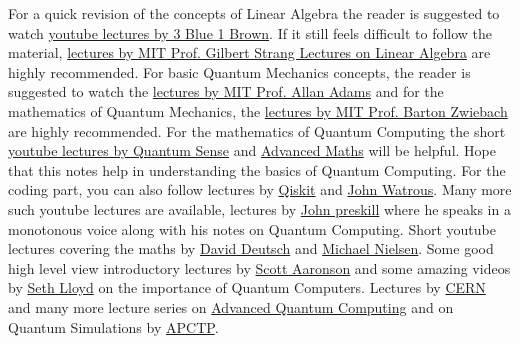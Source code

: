 \documentclass[12pt, oneside]{book}
\theoremstyle{definition}
\theoremstyle{definition}
\theoremstyle{remark}
\begin{document}
For a quick revision of the concepts of Linear Algebra the 
reader is suggested to watch \href{https://www.youtube.com/watch?v=fNk_zzaMoSs&list=PLZHQObOWTQDPD3MizzM2xVFitgF8hE_ab}{youtube lectures by 3 Blue 1 Brown}. If it still feels 
difficult to follow the material, \href{https://www.youtube.com/watch?v=7UJ4CFRGd-U&list=PL221E2BBF13BECF6C}{lectures by MIT Prof. Gilbert
Strang Lectures on Linear Algebra} are highly recommended. For basic Quantum Mechanics
concepts, the reader is suggested to watch the \href{https://www.youtube.com/watch?v=lZ3bPUKo5zc&list=PLUl4u3cNGP61-9PEhRognw5vryrSEVLPr}{lectures by MIT Prof. Allan Adams} and for the mathematics
of Quantum Mechanics, the \href{https://www.youtube.com/watch?v=jANZxzetPaQ&list=PLUl4u3cNGP60cspQn3N9dYRPiyVWDd80G}{lectures by MIT Prof. Barton Zwiebach} are highly recommended. For the 
mathematics of Quantum Computing the short \href{https://www.youtube.com/watch?v=3nvbBEzfmE8&list=PL8ER5-vAoiHAWm1UcZsiauUGPlJChgNXC}{youtube lectures by Quantum Sense} and \href{https://www.youtube.com/watch?v=zm64o27eHYw&list=PLxP0p--aBHmIe--9rczWe4AZmw03e2bz0}{Advanced Maths} will be helpful. Hope that this
notes help in understanding the basics of Quantum Computing. 
For the coding part, you can also follow lectures by \href{https://www.youtube.com/watch?v=Rs2TzarBX5I&list=PLOFEBzvs-VvrXTMy5Y2IqmSaUjfnhvBHR}{Qiskit} and \href{https://www.youtube.com/watch?v=42OiBzfdE2o&list=PLOFEBzvs-VvqKKMXX4vbi4EB1uaErFMSO}{John Watrous}.
Many more such youtube lectures are available, lectures by \href{https://www.youtube.com/watch?v=w08pSFsAZvE&list=PL0ojjrEqIyPy-1RRD8cTD_lF1hflo89Iu}{John preskill} where he speaks in a monotonous voice along with his notes on Quantum Computing.
Short youtube lectures covering the maths by \href{https://www.youtube.com/watch?v=mpkYPEaifUg&list=PLqdVnC7OWuEcfKRZXsrooK_EPzwmWSi-N}{David Deutsch} and \href{https://www.youtube.com/watch?v=X2q1PuI2RFI&list=PL1826E60FD05B44E4}{Michael Nielsen}.
Some good high level view introductory lectures by \href{https://www.youtube.com/watch?v=s1bxNomtaTE}{Scott Aaronson} and some amazing videos by \href{https://www.youtube.com/results?search_query=Quantum+Compting+Seth+lloyd}{Seth Lloyd} on the importance of Quantum Computers.
Lectures by \href{https://www.youtube.com/watch?v=jwHM8AHOtJ0&list=PL_rDPTSJrz8eFc6lb8twvsV39cxSwpJ6r}{CERN} and many more lecture series on \href{https://www.youtube.com/watch?v=vOo1rI_RRJo&list=PLDOlG2kTN3Z4xwQmnjSQomAqr3YDyCreJ}{Advanced Quantum Computing} and on
Quantum Simulations by \href{https://www.youtube.com/watch?v=a2ZxgUc20LE&list=PLf3vbYicbcT_l-qgpta8_K8gYH0JVmoL8}{APCTP}.
\end{document}
